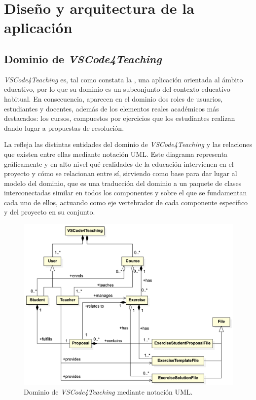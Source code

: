 \section{Diseño y arquitectura de la aplicación}
\label{sec:diseñoArquitectura}

\subsection{Dominio de \textit{VSCode4Teaching}}
\label{subsec:arqDominio}
\textit{VSCode4Teaching} es, tal como constata la , una aplicación orientada al ámbito educativo, por lo que su dominio es un subconjunto del contexto educativo habitual. En consecuencia, aparecen en el dominio dos roles de usuarios, estudiantes y docentes, además de los elementos reales académicos más destacados: los cursos, compuestos por ejercicios que los estudiantes realizan dando lugar a propuestas de resolución.

La  refleja las distintas entidades del dominio de \textit{VSCode4Teaching} y las relaciones que existen entre ellas mediante notación UML. Este diagrama representa gráficamente y en alto nivel qué realidades de la educación intervienen en el proyecto y cómo se relacionan entre sí, sirviendo como base para dar lugar al modelo del dominio, que es una traducción del dominio a un paquete de clases interconectadas similar en todos los componentes y sobre el que se fundamentan cada uno de ellos, actuando como eje vertebrador de cada componente específico y del proyecto en su conjunto.

\begin{figure}[ht]
    \centering
    \includegraphics[width=\textwidth]{imagenes/utilizadas/4-2-arquitectura/diagramas/diag1-dominioAltoNivel.png}
    \caption{Dominio de \textit{VSCode4Teaching} mediante notación UML.}
    \label{fig:dominioV4T}
\end{figure}

